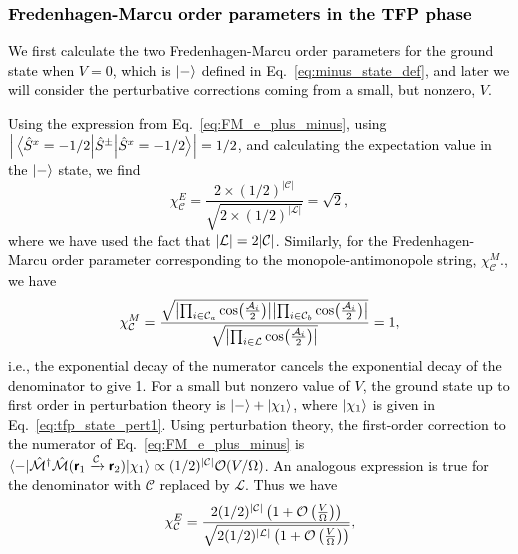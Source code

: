\documentclass[twocolumn,superscriptaddress,amsmath,amssymb,aps,prx,nofootinbib]{revtex4-2}
\newcommand{\dual}[1]{\boldsymbol{\mathsf{#1}}}
\newcommand{\newtext}[1]{\textcolor{black}{#1}}
\begin{document}
\newtext{\subsubsection{Fredenhagen-Marcu order parameters in the TFP phase}} \label{sec:FM_tfp}

\newtext{We first calculate the two Fredenhagen-Marcu order parameters for the ground state when $V = 0$, which is $\ket{-}$ defined in Eq.~\eqref{eq:minus_state_def}, and later we will consider the perturbative corrections coming from a small, but nonzero, $V$.} 

\newtext{Using the expression from Eq.~\eqref{eq:FM_e_plus_minus}, using $\abs{ \expval{ \hat{S}^{\pm}   }{\hat{S}^x = -1/2} } = 1/2$, and calculating the expectation value in the $\ket{-}$ state, we find 
\begin{equation}
    \chi_\mathcal{C}^E = \frac{2 \times (1/2)^{|\mathcal{C}|}}{\sqrt{ 2 \times (1/2)^{|\mathcal{L}|} }} = \sqrt{2},
\end{equation}
where we have used the fact that $\abs{\mathcal{L}} = 2 \abs{\mathcal{C}}$. Similarly, for the Fredenhagen-Marcu order parameter corresponding to the monopole-antimonopole string, $\chi_\mathcal{C}^M$., we have
\begin{equation}
    \chi_\mathcal{C}^M = \frac{\sqrt{\abs{\prod_{i \in \mathcal{C}_a} \cos(\frac{\mathcal{A}_i}{2})}\abs{\prod_{i \in \mathcal{C}_b} \cos(\frac{\mathcal{A}_i}{2})}   }}{\sqrt{\abs{\prod_{i \in \mathcal{L}} \cos(\frac{\mathcal{A}_i}{2}) } }}=1,
\end{equation}
i.e., the exponential decay of the numerator cancels the exponential decay of the denominator to give 1. 
For a small but nonzero value of $V$, the ground state up to first order in perturbation theory is $\ket{-} + \ket{\chi_1}$, where $\ket{\chi_1}$ is given in Eq.~\eqref{eq:tfp_state_pert1}. Using perturbation theory, the first-order correction to the numerator of Eq.~\eqref{eq:FM_e_plus_minus} is $\langle - | \hat{\mathcal{M}}^\dagger \hat{\mathcal{M}} (\dual{r}_1 \xrightarrow{\mathcal{C}} \dual{r}_2) | \chi_1 \rangle \propto (1/2)^{\abs{\mathcal{C}}} \mathcal{O} (V/\Omega)$. An analogous expression is true for the denominator with $\mathcal{C}$ replaced by $\mathcal{L}$. Thus we have
\begin{equation}
    \chi_\mathcal{C}^E = \frac{ 2 (1/2)^{\abs{\mathcal{C}}} \left( 1+\mathcal{O} \left( \frac{V}{\Omega} \right)\right)}{\sqrt{2 (1/2)^{\abs{\mathcal{L}}} \left( 1+\mathcal{O} \left( \frac{V}{\Omega} \right)\right)}},
\end{equation}
}
\end{document}
